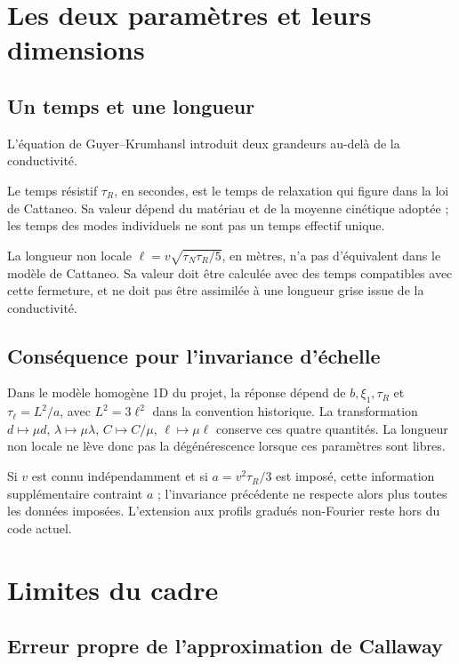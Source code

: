 \documentclass[11pt,a4paper]{article}
\begin{document}
\section{Les deux paramètres et leurs dimensions}

\subsection{Un temps et une longueur}

L'équation de Guyer--Krumhansl introduit deux grandeurs au-delà de la conductivité.

Le temps résistif $\tau_R$, en secondes, est le temps de relaxation qui figure dans la loi de
Cattaneo. Sa valeur dépend du matériau et de la moyenne cinétique adoptée ;
les temps des modes individuels ne sont pas un temps effectif unique.

La longueur non locale $\ell = v\sqrt{\tau_N \tau_R / 5}$, en mètres, n'a pas d'équivalent dans le
modèle de Cattaneo. Sa valeur doit être calculée avec des temps compatibles
avec cette fermeture, et ne doit pas être assimilée à une longueur grise issue de la conductivité.

\subsection{Conséquence pour l'invariance d'échelle}
Dans le modèle homogène 1D du projet, la réponse dépend de
$b,\xi_1,\tau_R$ et $\tau_\ell=L^2/a$, avec $L^2=3\ell^2$ dans la convention historique.
La transformation $d\mapsto\mu d$, $\lambda\mapsto\mu\lambda$,
$C\mapsto C/\mu$, $\ell\mapsto\mu\ell$ conserve ces quatre quantités.
La longueur non locale ne lève donc pas la dégénérescence lorsque ces paramètres sont libres.

Si $v$ est connu indépendamment et si $a=v^2\tau_R/3$ est imposé,
cette information supplémentaire contraint $a$ ; l'invariance précédente
ne respecte alors plus toutes les données imposées.
L'extension aux profils gradués non-Fourier reste hors du code actuel.

\section{Limites du cadre}

\subsection{Erreur propre de l'approximation de Callaway}
\end{document}
